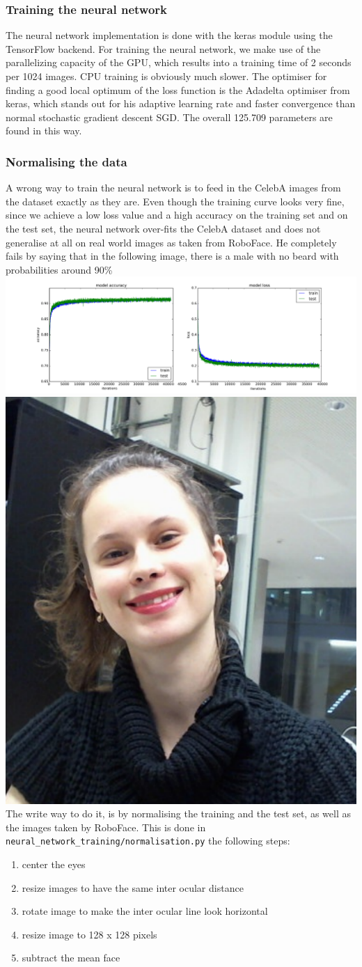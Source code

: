\documentclass[12.5pt]{scrartcl}
\begin{document}
	\subsubsection{Training the neural network}
	The neural network implementation is done with the keras module using the TensorFlow backend. For training the neural network, we make use of the parallelizing capacity of the GPU, which results into a training time of 2 seconds per 1024 images. CPU training is obviously much slower.
	The optimiser for finding a good local optimum of the loss function is the Adadelta optimiser from keras, which stands out for his adaptive learning rate and faster convergence than normal stochastic gradient descent SGD. The overall 125.709 parameters are found in this way.
	\subsubsection{Normalising the data}
	A wrong way to train the neural network is to feed in the CelebA images from the dataset exactly as they are. Even though the training curve looks very fine, since we achieve a low loss value and a high accuracy on the training set and on the test set, the neural network over-fits the CelebA dataset and does not generalise at all on real world images as taken from RoboFace. He completely fails by saying that in the following image, there is a male with no beard with probabilities around 90\%
	\includegraphics[width=\linewidth]{images/lossBad}\\
	\includegraphics[width=0.2\linewidth]{images/failMaleNoBeard}\\
	
	The write way to do it, is by normalising the training and the test set, as well as the images taken by RoboFace. This is done in \texttt{neural\_network\_training/normalisation.py} the following steps:
	\begin{enumerate}
	\item center the eyes
	\item resize images to have the same inter ocular distance
	\item rotate image to make the inter ocular line look horizontal
	\item resize image to 128 x 128 pixels
	\item subtract the mean face
	\end{enumerate}
\end{document}
